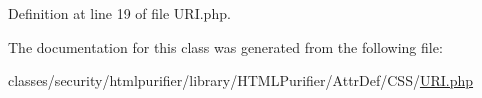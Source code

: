 Definition at line 19 of file U\+R\+I.\+php.



The documentation for this class was generated from the following file\+:\begin{DoxyCompactItemize}
\item 
classes/security/htmlpurifier/library/\+H\+T\+M\+L\+Purifier/\+Attr\+Def/\+C\+S\+S/\hyperlink{AttrDef_2CSS_2URI_8php}{U\+R\+I.\+php}\end{DoxyCompactItemize}
